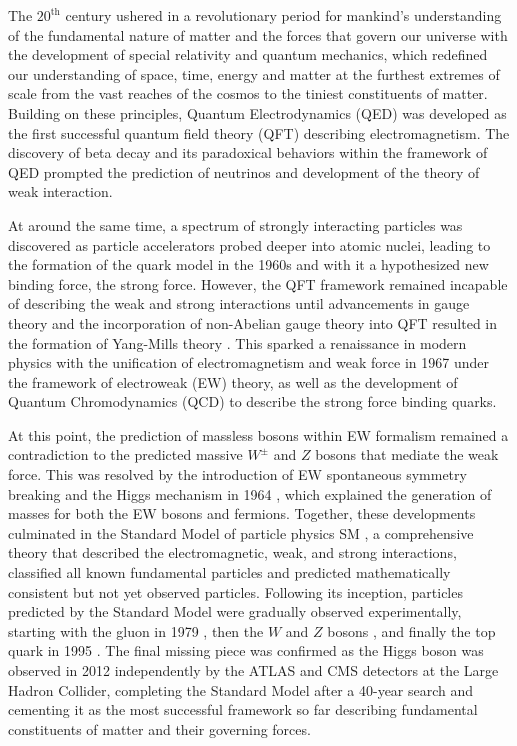 \documentclass[../thesis.tex]{subfiles}
\begin{document}
\vspace{-1\baselineskip}

The $20^\text{th}$ century ushered in a revolutionary period for mankind's understanding of the fundamental nature of matter and the forces that govern our universe with the development of special relativity and quantum mechanics, which redefined our understanding of space, time, energy and matter at the furthest extremes of scale from the vast reaches of the cosmos to the tiniest constituents of matter. Building on these principles, Quantum Electrodynamics (QED) \tocite was developed as the first successful quantum field theory (\acs{QFT}) describing electromagnetism. The discovery of beta decay \tocite and its paradoxical behaviors within the framework of \acs{QED} prompted the prediction of neutrinos and development of the theory of weak interaction.

At around the same time, a spectrum of strongly interacting particles was discovered \tocite as particle accelerators probed deeper into atomic nuclei, leading to the formation of the quark model in the 1960s \tocite and with it a hypothesized new binding force, the strong force. However, the \acs{QFT} framework remained incapable of describing the weak and strong interactions until advancements in gauge theory and the incorporation of non-Abelian gauge theory into \acs{QFT} resulted in the formation of Yang-Mills theory \tocite. This sparked a renaissance in modern physics with the unification of electromagnetism and weak force in 1967 \tocite under the framework of electroweak (\acs{EW}) theory, as well as the development of Quantum Chromodynamics (\acs{QCD}) \tocite to describe the strong force binding quarks.

At this point, the prediction of massless bosons within \acs{EW} formalism remained a contradiction to the predicted massive $W^\pm$ and $Z$ bosons that mediate the weak force. This was resolved by the introduction of \acs{EW} spontaneous symmetry breaking and the Higgs mechanism in 1964 \tocite, which explained the generation of masses for both the \acs{EW} bosons and fermions. Together, these developments culminated in the Standard Model of particle physics \acs{SM} \tocite, a comprehensive theory that described the electromagnetic, weak, and strong interactions, classified all known fundamental particles and predicted mathematically consistent but not yet observed particles. Following its inception, particles predicted by the Standard Model were gradually observed experimentally, starting with the gluon in 1979 \tocite, then the $W$ and $Z$ bosons \tocite, and finally the top quark in 1995 \tocite. The final missing piece was confirmed as the Higgs boson was observed in 2012 \tocite independently by the \acs{ATLAS} and \acs{CMS} detectors at the Large Hadron Collider, completing the Standard Model after a 40-year search and cementing it as the most successful framework so far describing fundamental constituents of matter and their governing forces.
\end{document}
